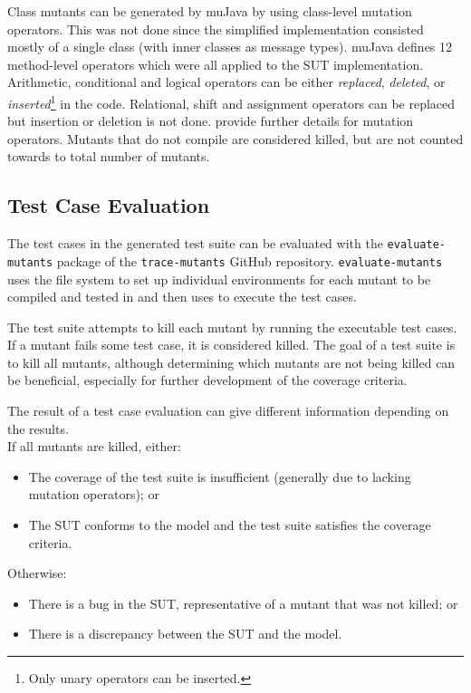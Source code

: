\documentclass{article}
\begin{document}
			Class mutants can be generated by muJava by using class-level mutation operators. This was not done since the simplified implementation consisted mostly of a single class (with inner classes as message types). muJava defines 12 method-level operators which were all applied to the SUT implementation. Arithmetic, conditional and logical operators can be either \textit{replaced}, \textit{deleted}, or \textit{inserted}\footnote{Only unary operators can be inserted.} in the code. Relational, shift and assignment operators can be replaced but insertion or deletion is not done. \citet{mutopsMethod} provide further details for mutation operators. Mutants that do not compile are considered killed, but are not counted towards to total number of mutants.

		\subsection{Test Case Evaluation}
			\label{sec:method_testing}
			The test cases in the generated test suite can be evaluated with the \texttt{evaluate-mutants} package of the \texttt{trace-mutants} GitHub repository. \texttt{evaluate-mutants} uses the file system to set up individual environments for each mutant to be compiled and tested in and then uses \citeauthor{sbt} to execute the test cases.

			The test suite attempts to kill each mutant by running the executable test cases. If a mutant fails some test case, it is considered killed. The goal of a test suite is to kill all mutants, although determining which mutants are not being killed can be beneficial, especially for further development of the coverage criteria.

			The result of a test case evaluation can give different information depending on the results. \\
			If all mutants are killed, either:
				\begin{itemize}
					\item The coverage of the test suite is insufficient (generally due to lacking mutation operators); or
					\item The SUT conforms to the model and the test suite satisfies the coverage criteria.
				\end{itemize}
			Otherwise:
				\begin{itemize}
					\item There is a bug in the SUT, representative of a mutant that was not killed; or
					\item There is a discrepancy between the SUT and the model.
				\end{itemize}
\end{document}
